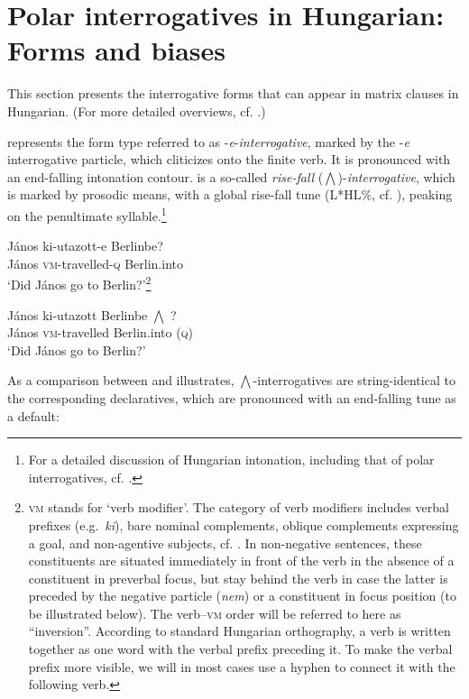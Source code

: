 \documentclass[output=paper,colorlinks,citecolor=brown]{langscibook}
\begin{document}
	
\section{Polar interrogatives in Hungarian: Forms and biases}\label{sect:forms}
	
	This section presents the interrogative forms that can appear in matrix clauses in Hungarian. (For more detailed overviews, cf. \citealt{Gyuris2017, gyuris18}.)
	
	 represents the form type referred to as \nobreakdash-\textit{e}-\textit{interrogative}, marked by the \nobreakdash-\textit{e} interrogative particle, which cliticizes onto the finite verb. It is pronounced with an end-falling intonation contour.  is a so-called \textit{rise-fall} ($\bigwedge$)-\textit{interrogative}, which is marked by prosodic means, with a global rise-fall tune (L*HL\%, cf. \citealt{ladd96}), peaking on the penultimate syllable.\footnote{For a detailed discussion of Hungarian intonation, including that of polar interrogatives, cf. \citet{varga2002}.}
	
	\ea\label{ex:elutazott-e}
	\gll J\'anos ki-utazott-e Berlinbe?\\
	J\'anos \textsc{vm}-travelled-\textsc{q} Berlin.into\\
	\glt`Did János go to Berlin?'\footnote{\textsc{vm} stands for `verb modifier'. The category of verb modifiers includes verbal prefixes (e.g.~\textit{ki}), bare nominal complements, oblique complements expressing a goal, and non-agentive subjects, cf. \citet[57]{ekiss2002}. In non-negative sentences, these constituents are situated immediately in front of the verb in the absence of a constituent in preverbal focus, but stay behind the verb in case the latter is preceded by the negative particle (\textit{nem}) or a constituent in focus position (to be illustrated below). The verb--\textsc{vm} order will be referred to here as ``inversion''. According to standard Hungarian orthography, a verb is written together as one word with the verbal prefix preceding it. To make the verbal prefix more visible, we will in most cases use a hyphen to connect it with the following verb.}
	\z
	
	\ea\label{ex:elutazott?} 
	\gll J\'anos ki-utazott {Berlinbe} {$\bigwedge$ ?}\\
	J\'anos \textsc{vm}-travelled Berlin.into (\textsc{q})\\
	\glt `Did János go to Berlin?' 
	\z
	
	
	As a comparison between  and  illustrates, $\bigwedge$-interrogatives are string-identical to the corresponding  declaratives, which are pronounced with an end-falling tune as a default:
	
\end{document}
